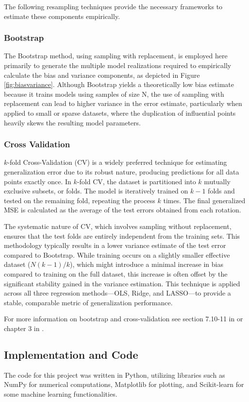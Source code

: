\documentclass[twocolumn,aps]{revtex4}
\begin{document}
The following resampling techniques provide the necessary frameworks to estimate these components empirically.

\subsubsection{Bootstrap}
The Bootstrap method, using sampling with replacement, is employed here primarily to generate the multiple model realizations required to empirically calculate the bias and variance components, as depicted in Figure \ref{fig:biasvariance}. 
Although Bootstrap yields a theoretically low bias estimate because it trains models using samples of size N, the use of sampling with replacement can lead to higher variance in the error estimate, particularly when applied to small or sparse datasets, where the duplication of influential points heavily skews the resulting model parameters.

\subsubsection{Cross Validation}
$k$-fold Cross-Validation (CV) is a widely preferred technique for estimating generalization error due to its robust nature, producing predictions for all data points exactly once.
In $k$-fold CV, the dataset is partitioned into $k$ mutually exclusive subsets, or folds. 
The model is iteratively trained on $k-1$ folds and tested on the remaining fold, repeating the process $k$ times. 
The final generalized MSE is calculated as the average of the test errors obtained from each rotation.

The systematic nature of CV, which involves sampling without replacement, ensures that the test folds are entirely independent from the training sets. 
This methodology typically results in a lower variance estimate of the test error compared to Bootstrap. 
While training occurs on a slightly smaller effective dataset ($N(k-1)/k$), which might introduce a minimal increase in bias compared to training on the full dataset, this increase is often offset by the significant stability gained in the variance estimation. 
This technique is applied across all three regression methods—OLS, Ridge, and LASSO—to provide a stable, comparable metric of generalization performance.

For more information on bootstrap and cross-validation see section 7.10-11 in \citet{hastie} or chapter 3 in \citet{compfys}.


\subsection{Implementation and Code}
The code for this project was written in Python, utilizing libraries such as NumPy for numerical computations, Matplotlib for plotting, and Scikit-learn for some machine learning functionalities.
\end{document}
